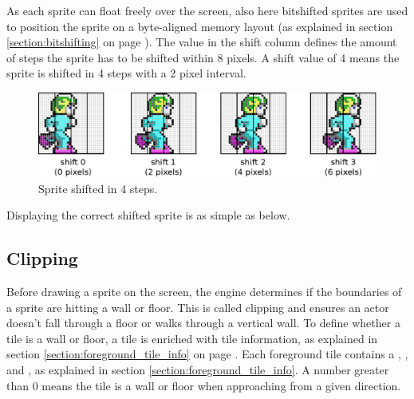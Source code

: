 \documentclass[book.tex]{subfiles}
\begin{document}
\par
As each sprite can float freely over the screen, also here bitshifted sprites are used to position the sprite on a byte-aligned memory layout (as explained in section \ref{section:bitshifting} on page \pageref{section:bitshifting}). The value in the shift column defines the amount of steps the sprite has to be shifted within 8 pixels. A shift value of 4 means the sprite is shifted in 4 steps with a 2 pixel interval.\\ 

\begin{figure}[H]
  \centering
  \includegraphics[width=\textwidth]{imgs/drawings/sprite_shift.eps}
  \caption{Sprite shifted in 4 steps.}
  \label{fig:sprite_shift}  
\end{figure}
\par
Displaying the correct shifted sprite is as simple as below. 
\\
\par
\begin{minipage}{\textwidth}
  
\end{minipage}
\label{state_type}
\par


\subsection{Clipping}
\label{section:clipping}
Before drawing a sprite on the screen, the engine determines if the boundaries of a sprite are hitting a wall or floor. This is called clipping and ensures an actor doesn't fall through a floor or walks through a vertical wall. To define whether a tile is a wall or floor, a tile is enriched with tile information, as explained in section \ref{section:foreground_tile_info} on page \pageref{section:foreground_tile_info}. Each foreground tile contains a , ,  and , as explained in section \ref{section:foreground_tile_info}. A number greater than 0 means the tile is a wall or floor when approaching from a given direction. 
\end{document}
